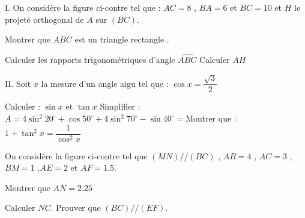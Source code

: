 \documentclass[a4paper,addpoints,12pt]{exam}
\begin{document}
\begin{exo}[6]
I. On considère la figure ci-contre tel que : $AC=8$ , $BA=6$ et $BC=10$ et $H$ le projeté orthogonal de $A$ sur $(BC)$.
\begin{questions}
\question[1] Montrer que $ABC$ est un triangle rectangle .\droppoints
\begin{minipage}{0.6\linewidth}
\anserline[7]
\end{minipage}%
\begin{minipage}{0.4\linewidth}
\end{minipage}
\question[1] Calculer les rapports trigonométriques d'angle $\widehat{ABC}$\droppoints
\anserline[5]
\question[1] Calculer $AH$\droppoints
\anserline[6]
\end{questions}
II. Soit $x$ la mesure d'un angle aigu tel que : $\cos x =\dfrac{\sqrt{3}}{2}$
\begin{questions}
\setcounter{question}{3}
\question[1] Calculer : $\sin x$ et $\tan x$\droppoints
\anserline[4]
\question[1] Simplifier  :\droppoints
$A = 4\sin^{2}20^{\circ} +\cos50^{\circ} +4\sin^{2}70^{\circ}-\sin40^{\circ} =$\anserline[5]
\question[1] Montrer que : $1+\tan^{2}x = \dfrac{1}{\cos^{2}x}$\droppoints
\anserline[5]
\end{questions}
\end{exo}
\newpage
\begin{exo}[3]
On considère la figure ci-contre tel que $(MN)//(BC)$ , $AB=4$ , $AC=3$ , $BM=1$ ,$AE=2$ et $AF=1.5$.
\begin{questions}
\question[1] Montrer que $AN=2.25$ \droppoints
\begin{minipage}{0.6\linewidth}
\anserline[6]
\end{minipage}
\begin{minipage}{0.4\linewidth}
\end{minipage}
\anserline[2]
\question[1]  Calculer $NC$.\droppoints
\anserline[9]
\question[1] Prouver que $(BC)//(EF)$.\droppoints
\anserline[10]
\end{questions}
\end{exo}
\end{document}

